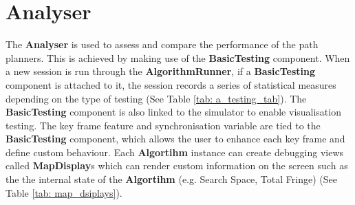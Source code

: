\section{Analyser}

The \textbf{Analyser} is used to assess and compare the performance of the path planners. This is achieved by making use of the \textbf{BasicTesting} component. When a new session is run through the \textbf{AlgorithmRunner}, if a \textbf{BasicTesting} component is attached to it, the session records a series of statistical measures depending on the type of testing (See Table \ref{tab: a_testing_tab}). The \textbf{BasicTesting} component is also linked to the simulator to enable visualisation testing. The key frame feature and synchronisation variable are tied to the \textbf{BasicTesting} component, which allows the user to enhance each key frame and define custom behaviour. Each \textbf{Algortihm} instance can create debugging views called \textbf{MapDisplay}s which can render custom information on the screen such as the the internal state of the \textbf{Algortihm} (e.g. Search Space, Total Fringe) (See Table \ref{tab: map_dsiplays}).

